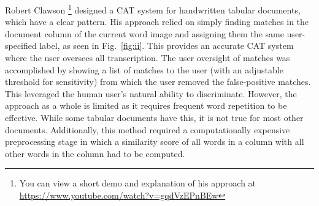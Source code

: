 \documentclass[ms]{byuprop}
\begin{document}
Robert Clawson \cite{Clawson2014}\footnote{You can view a short demo and explanation of his approach at \url{https://www.youtube.com/watch?v=gqdVzEPnBEw}} designed a CAT system for handwritten tabular documents, which have a clear pattern. His approach relied on simply finding matches in the document column of the current word image and assigning them the same user-specified label, as seen in Fig.~\ref{fig:ii}. This provides an accurate CAT system where the user oversees all transcription. The user oversight of matches was accomplished by showing a list of matches to the user (with an adjustable threshold for sensitivity) from which the user removed the false-positive matches. This leveraged the human user's natural ability to discriminate. However, the approach as a whole is limited as it requires frequent word repetition to be effective. While some tabular documents have this, it is not true for most other documents. Additionally, this method required a computationally expensive preprocessing stage in which a similarity score of all words in a column with all other words in the column had to be computed.
\end{document}
